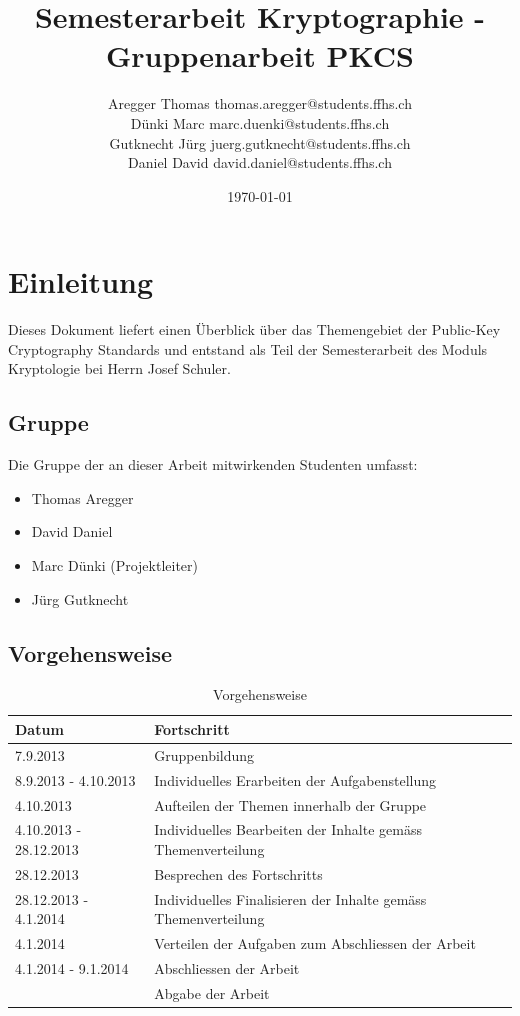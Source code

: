 \documentclass[10pt,a4paper]{article}
\title{Semesterarbeit Kryptographie - Gruppenarbeit  PKCS}
\author{
    Aregger Thomas \small{thomas.aregger@students.ffhs.ch}\\
    Dünki Marc \small{marc.duenki@students.ffhs.ch}\\
    Gutknecht Jürg \small{juerg.gutknecht@students.ffhs.ch}\\
    Daniel David \small{david.daniel@students.ffhs.ch}
}
\date{\today}
\begin{document}
\maketitle
\tableofcontents

\section{Einleitung}
Dieses Dokument liefert einen Überblick über das Themengebiet der Public-Key Cryptography
Standards und entstand als Teil der Semesterarbeit des Moduls Kryptologie bei Herrn Josef
Schuler.

\subsection{Gruppe}
Die Gruppe der an dieser Arbeit mitwirkenden Studenten umfasst:
\begin{itemize}
   \item Thomas Aregger
   \item David Daniel
   \item Marc Dünki (Projektleiter)
   \item Jürg Gutknecht
\end{itemize}

\subsection{Vorgehensweise}

\begin{table}[ht]
   \centering
   \begin{tabular}{|l|p{7.8cm}|} \hline
      \textbf{Datum} & \textbf{Fortschritt} \\\hline
      7.9.2013 & Gruppenbildung \\\hline
      8.9.2013 - 4.10.2013 & Individuelles Erarbeiten der Aufgabenstellung \\\hline
      4.10.2013 & Aufteilen der Themen innerhalb der Gruppe \\\hline
      4.10.2013 - 28.12.2013 & Individuelles Bearbeiten der Inhalte gemäss
         Themenverteilung \\\hline
      28.12.2013 & Besprechen des Fortschritts \\\hline
      28.12.2013 - 4.1.2014 & Individuelles Finalisieren der Inhalte gemäss
         Themenverteilung \\\hline
      4.1.2014 & Verteilen der Aufgaben zum Abschliessen der Arbeit \\\hline
      4.1.2014 - 9.1.2014 & Abschliessen der Arbeit \\\hline
         & Abgabe der Arbeit \\\hline
   \end{tabular}
   \caption{Vorgehensweise}
   \label{tab:vorgehensweise}
\end{table}
\end{document}
